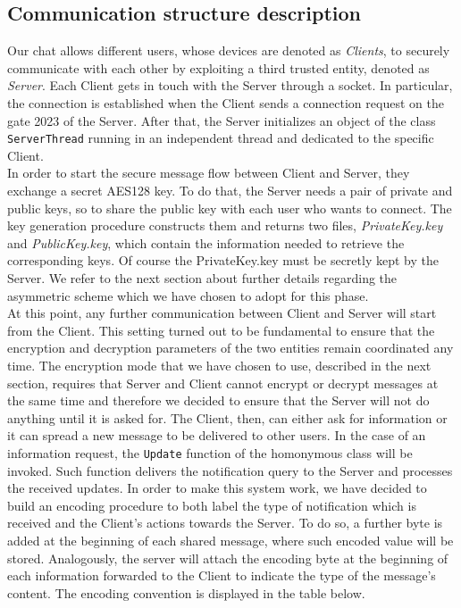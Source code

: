\documentclass[12pt]{article}
\begin{document}
\subsection*{Communication structure description}
Our chat allows different users, whose devices are denoted as {\em Clients}, to securely communicate with each other by exploiting a third trusted entity, denoted as {\em Server}. Each Client gets in touch with the Server through a socket. In particular, the connection is established when the Client sends a connection request on the gate 2023 of the Server. After that, the Server initializes an object of the class \texttt{ServerThread} running in an independent thread and dedicated to the specific Client.\\
In order to start the secure message flow between Client and Server, they exchange a secret AES128 key. To do that, the Server needs a pair of private and public keys, so to share the public key with each user who wants to connect. The key generation procedure constructs them and returns two files, {\em PrivateKey.key} and {\em PublicKey.key}, which contain the information needed to retrieve the corresponding keys. Of course the PrivateKey.key must be secretly kept by the Server. We refer to the next section about further details regarding the asymmetric scheme which we have chosen to adopt for this phase. \\ 
At this point, any further communication between Client and Server will start from the Client. This setting turned out to be fundamental to ensure that the encryption and decryption parameters of the two entities remain coordinated any time. The encryption mode that we have chosen to use, described in the next section, requires that Server and Client cannot encrypt or decrypt messages at the same time and therefore we decided to ensure that the Server will not do anything until it is asked for. The Client, then, can either ask for information or it can spread a new message to be delivered to other users. In the case of an information request, the \texttt{Update} function of the homonymous class will be invoked. Such function delivers the notification query to the Server and processes the received updates. In order to make this system work, we have decided to build an encoding procedure to both label the type of notification which is received and the Client's actions towards the Server. To do so, a further byte is added at the beginning of each shared message, where such encoded value will be stored. Analogously, the server will attach the encoding byte at the beginning of each information forwarded to the Client to indicate the type of the message's content. The encoding convention is displayed in the table below. \bigskip
\end{document}
